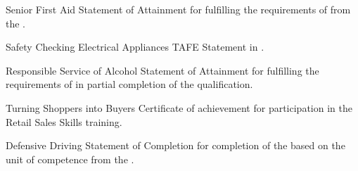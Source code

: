 \begin{qualifications}

{Senior First Aid}
{Statement of Attainment for fulfilling the requirements of
 from the
.}

{Safety Checking Electrical Appliances}
{TAFE Statement in .}

{Responsible Service of Alcohol}
{Statement of Attainment for fulfilling the requirements of
 in
partial completion of the  qualification.}

{Turning Shoppers into Buyers}
{Certificate of achievement for participation in the 
 Retail Sales Skills training.}

{Defensive Driving}
{Statement of Completion for completion of the  based on the unit of competence
 from the
.}

\end{qualifications}
